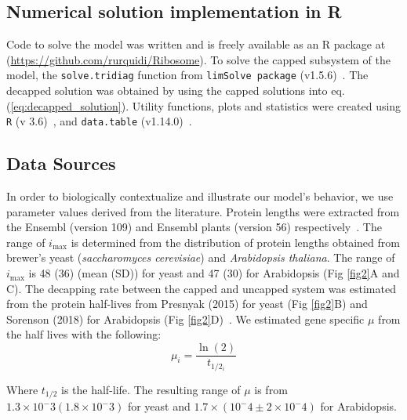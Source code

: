 \documentclass[10pt,letterpaper]{article}
\newcommand{\imax}{\ensuremath{{i_{\max}}}\xspace}
\begin{document}
\subsection*{Numerical solution implementation in R}
Code to solve the model was written and is freely available as an R package at (\url{https://github.com/rurquidi/Ribosome}).
To solve the capped subsystem of the model, the \texttt{solve.tridiag} function from \texttt{limSolve package} (v1.5.6)~\cite{RN41}.
The decapped solution was obtained by using the capped solutions into eq. (\ref{eq:decapped_solution}).
Utility functions, plots and statistics were created using  \texttt{R} (v 3.6)~\cite{RN43}, and  \texttt{data.table} (v1.14.0)~\cite{RN42}. 

\subsection*{Data Sources}

In order to biologically contextualize and illustrate our model's behavior, we use parameter values derived from the literature.
Protein lengths were extracted from the Ensembl (version 109) and Ensembl plants (version 56) respectively~\cite{RN26,RN25,RN24}.  
The range of \imax is determined from the distribution of protein lengths obtained from brewer's yeast (\textit{saccharomyces cerevisiae}) and \textit{Arabidopsis thaliana}.
The range of \imax is  48 (36) (mean (SD)) for yeast and 47 (30) for Arabidopsis (Fig \ref{fig2}A and C).
The decapping rate between the capped and uncapped system was estimated from the protein half-lives from Presnyak (2015) for yeast (Fig \ref{fig2}B) and Sorenson (2018) for Arabidopsis (Fig \ref{fig2}D)~\cite{RN27,RN28}.
We estimated gene specific $\mu$ from the half lives with the following:
\begin{equation*}
  \mu_i = \frac{\ln(2)}{t_{1/2_i}}
\end{equation*}

Where $t_{1/2}$ is the half-life. The resulting range of $\mu$ is from $1.3 \times 10^-3 (1.8 \times 10^-3)$ for yeast and $1.7 \times (10^-4 \pm 2 \times 10^-4)$ for Arabidopsis. 
\end{document}
